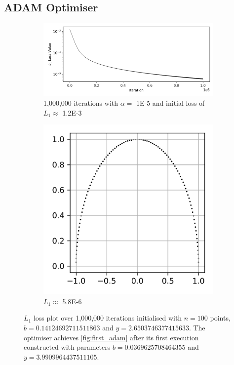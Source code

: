 \documentclass[a4paper]{report}
\begin{document}
\subsection{ADAM Optimiser}
\begin{figure}[H]
    \begin{subfigure}{.7\linewidth}
      \includegraphics[width=\linewidth]{images/gd/ADAM_loss.png}
      \caption{1,000,000 iterations with $\alpha =$ 1E-5 and initial loss of $L_1 \approx$ 1.2E-3 }
    \end{subfigure}\hfill
    \begin{subfigure}{.3\linewidth}
      \includegraphics[width=\linewidth]{images/gd/params_after_first_ADAM.png}
      \caption{$L_1 \approx$ 5.8E-6}
      \label{fig:first_adam}
    \end{subfigure}
    
    \caption{$L_1$ loss plot over 1,000,000 iterations initialised with $n = 100$ points, $b = 0.14124692711511863 $ and $y = 2.6503746377415633$. The optimiser achieves \autoref{fig:first_adam} after its first execution constructed with parameters $b = 0.0369625708464355$ and $y = 3.9909964437511105$. }
\end{figure}
\end{document}
